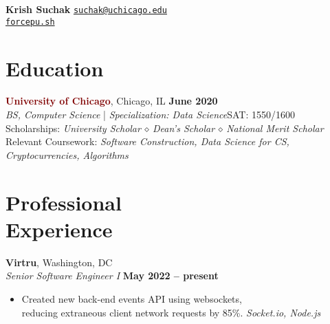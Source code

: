 \documentclass[margin]{resume}
\begin{document}
\hspace{-28mm}\textbf {\Large Krish Suchak}
\hfill \textcolor{blu}{\texttt{\href{mailto:suchak@uchicago.edu}{suchak@uchicago.edu}}}
\\ \phantom{invisible} \hfill \hspace{5mm} \texttt{\href{https://forcepu.sh}{force}}\textcolor{blu}{\texttt{\href{https://forcepu.sh}{pu.sh}}}
\vspace{4mm}

    \section{\mysidestyle Education}

    \textcolor{maroon}{\textbf{University of Chicago}}, Chicago, IL \hfill \textbf{June 2020} \vspace{2mm}\\\vspace{1mm}%
    \textsl{BS, Computer Science} | \textsl{Specialization: Data Science}\hfill SAT: 1550/1600\\
Scholarships: \textit{University Scholar $\smwhtdiamond$ Dean’s Scholar $\smwhtdiamond$ National Merit Scholar}\\
Relevant Coursework: \textit{Software Construction, Data Science for CS, Cryptocurrencies, Algorithms}

    \section{\mysidestyle Professional\\Experience}

    
    \textcolor{blu}{\textbf{Virtru}}, Washington, DC \vspace{2mm}\\\vspace{1mm}%
    \textsl{Senior Software Engineer I} \hfill \textbf{May 2022 -- present}
    \begin{itemize}

    \item Created new back-end events API using websockets,\\reducing extraneous client network requests by 85\%. \hfill \textit{Socket.io, Node.js}
    \end{itemize}    
\end{document}
